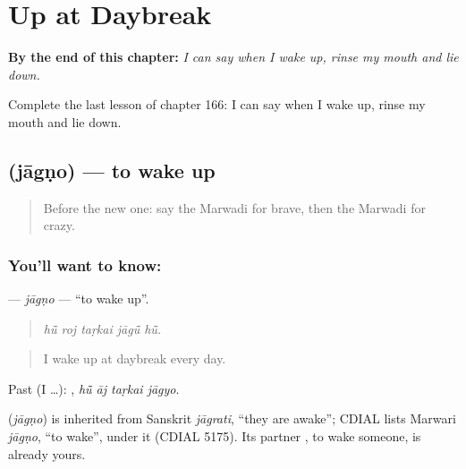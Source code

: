 
\chapter{Up at Daybreak}
\label{ch:mw-up-at-daybreak}

\begin{chapteropening}
\textbf{By the end of this chapter:} \emph{I can say when I wake up, rinse my mouth and lie down.}

Complete the last lesson of chapter 166: I can say when I wake up, rinse my mouth and lie down.
\end{chapteropening}

\section[\texorpdfstring{\mw{जागणो} (jāgṇo)}{जागणो (jāgṇo)}]{ (jāgṇo) — to wake up}

\label{lesson:MW-C166-jagno}



\begin{quote}
Before the new one: say the Marwadi for brave, then the Marwadi for crazy.
\end{quote}

\subsection*{You'll want to know: }
\textbf{} — \emph{jāgṇo} — \textquotedblleft{}to wake up\textquotedblright{}.

\begin{quote}
    
\end{quote}

\begin{quote}
\emph{hū̃ roj taṛkai jāgū̃ hū̃.}
\end{quote}

\begin{quote}
I wake up at daybreak every day.
\end{quote}

Past (I …):    , \emph{hū̃ āj taṛkai jāgyo}.

\begin{cousinweb}
\textbf{} (\emph{jāgṇo}) is inherited from Sanskrit \emph{jāgrati}, \textquotedblleft{}they are awake\textquotedblright{}; CDIAL lists Marwari \emph{jāgṇo}, \textquotedblleft{}to wake\textquotedblright{}, under it (CDIAL 5175). Its partner \textbf{}, to wake someone, is already yours.
\end{cousinweb}

